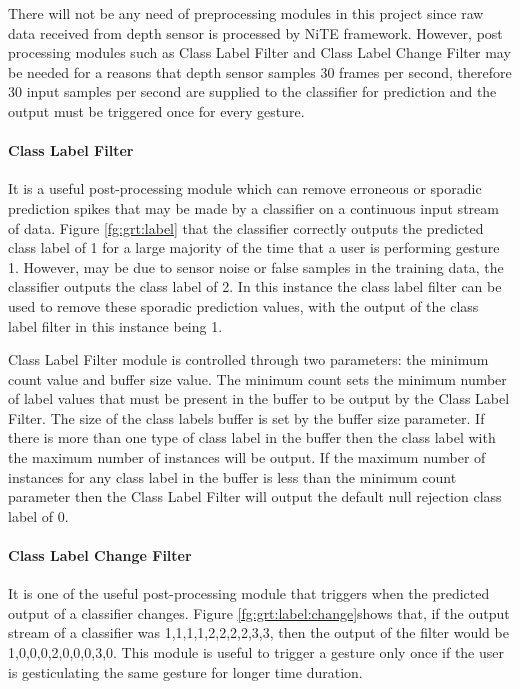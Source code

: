 There will not be any need of preprocessing modules in this project since raw data received from depth sensor is processed by NiTE framework. However, post processing modules such as Class Label Filter and Class Label Change Filter may be needed for a reasons that depth sensor samples 30 frames per second, therefore 30 input samples per second are supplied to the classifier for prediction and the output must be triggered once for every gesture. 



\paragraph*{Class Label Filter} It is a useful post-processing module which can remove erroneous or sporadic prediction spikes that may be made by a classifier on a continuous input stream of data. Figure \ref{fg:grt:label} that the classifier correctly outputs the predicted class label of 1 for a large majority of the time that a user is performing gesture 1. However, may be due to sensor noise or false samples in the training data, the classifier outputs the class label of 2. In this instance the class label filter can be used to remove these sporadic prediction values, with the output of the class label filter in this instance being 1. 

Class Label Filter module is controlled through two parameters: the minimum count value and buffer size value. The minimum count sets the minimum number of label values that must be present in the buffer to be output by the Class Label Filter. The size of the class labels buffer is set by the buffer size parameter. If there is more than one type of class label in the buffer then the class label with the maximum number of instances will be output. If the maximum number of instances for any class label in the buffer is less than the minimum count parameter then the Class Label Filter will output the default null rejection class label of 0.



\paragraph*{Class Label Change Filter} It is one of the useful post-processing module that triggers when the predicted output of a classifier changes. Figure \ref{fg:grt:label:change}shows that, if the output stream of a classifier was {1,1,1,1,2,2,2,2,3,3}, then the output of the filter would be {1,0,0,0,2,0,0,0,3,0}. This module is useful to trigger a gesture only once if the user is gesticulating the same gesture for longer time duration. 


